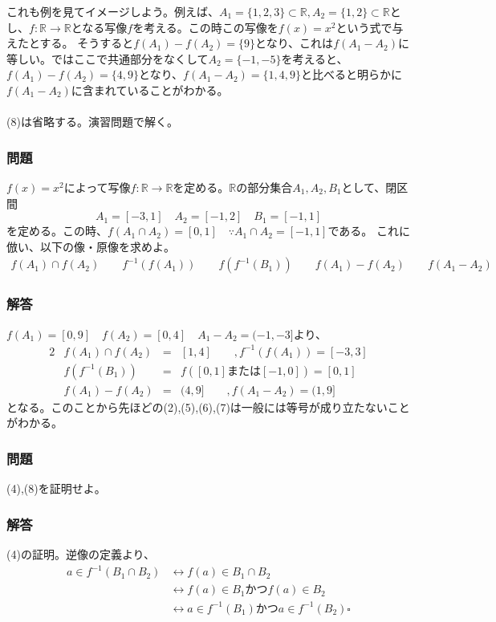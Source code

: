 \documentclass[a4j,dvipdfmx]{jsarticle}
\begin{document}
これも例を見てイメージしよう。例えば、$A_1=\{1,2,3\}\subset\mathbb{R},A_2=\{1,2\}\subset\mathbb{R}$とし、$f:\mathbb{R}\to\mathbb{R}$となる写像$f$を考える。この時この写像を$f(x)=x^2$という式で与えたとする。
そうすると$f(A_1)-f(A_2)=\{9\}$となり、これは$f(A_1-A_2)$に等しい。ではここで共通部分をなくして$A_2=\{-1,-5\}$を考えると、$f(A_1)-f(A_2)=\{4,9\}$となり、$f(A_1-A_2)=\{1,4,9\}$と比べると明らかに$f(A_1-A_2)$に含まれていることがわかる。\\
\hrulefill\\
(8)は省略する。演習問題で解く。\\
\hrulefill

\subsubsection*{問題}
$f(x)=x^2$によって写像$f:\mathbb{R}\to\mathbb{R}$を定める。$\mathbb{R}$の部分集合$A_1,A_2,B_1$として、閉区間
\begin{equation*}
    A_1=[-3,1]\quad A_2=[-1,2]\quad B_1=[-1,1] 
\end{equation*}
を定める。この時、$f(A_1\cap A_2)=[0,1]\quad\because A_1\cap A_2=[-1,1]$である。
これに倣い、以下の像・原像を求めよ。
\begin{align*}
    f(A_1)\cap f(A_2)\qquad f^{-1}(f(A_1))\qquad f(f^{-1}(B_1))\qquad f(A_1)-f(A_2)\qquad f(A_1-A_2)
\end{align*}
\vspace{3cm}
\subsubsection*{解答}
\color{red}
$f(A_1)=[0,9]\quad f(A_2)=[0,4]\quad A_1-A_2=(-1,-3]$より、
\begin{alignat*}{2}
    & f(A_1)\cap f(A_2) & = &[1,4]\qquad, f^{-1}(f(A_1))=[-3,3]\\
    & f(f^{-1}(B_1)) & = &f([0,1]\text{または}[-1,0])=[0,1]\\
    & f(A_1)-f(A_2) & = & (4,9]\qquad,f(A_1-A_2)=(1,9]
\end{alignat*}
となる。このことから先ほどの(2),(5),(6),(7)は一般には等号が成り立たないことがわかる。
\color{black}
\newpage
\subsubsection*{問題}
(4),(8)を証明せよ。
\vspace{10cm}
\subsubsection*{解答}
\color{red}
(4)の証明。逆像の定義より、
\begin{align*}
    a\in f^{-1}(B_1\cap B_2)
    &\leftrightarrow f(a)\in B_1\cap B_2\\
    &\leftrightarrow f(a)\in B_1かつf(a)\in B_2\\
    &\leftrightarrow a\in f^{-1}(B_1)かつ a\in f^{-1}(B_2)\square
\end{align*}
\end{document}
